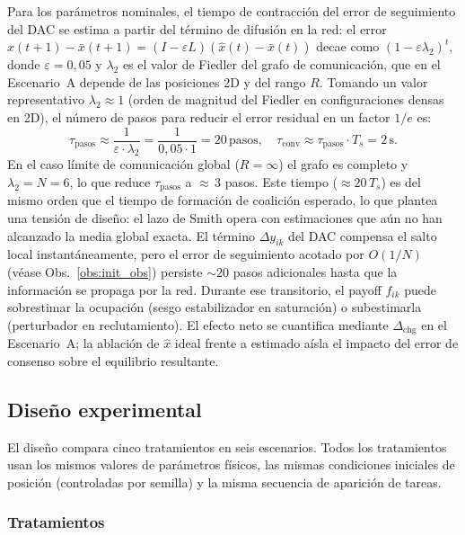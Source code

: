 \begin{observacion}
Para los parámetros nominales, el tiempo de contracción del error de seguimiento
del DAC se estima a partir del término de difusión en la red: el error
$\hat{x}(t{+}1) - \bar{x}(t{+}1) = (I - \varepsilon L)(\hat{x}(t) - \bar{x}(t))$
decae como $(1 - \varepsilon\lambda_2)^t$, donde $\varepsilon = 0{,}05$ y $\lambda_2$
es el valor de Fiedler del grafo de comunicación, que en el Escenario~A depende de
las posiciones 2D y del rango $R$. Tomando un valor representativo $\lambda_2 \approx 1$
(orden de magnitud del Fiedler en configuraciones densas en 2D), el número de pasos
para reducir el error residual en un factor $1/e$ es:
\[
  \tau_{\mathrm{pasos}} \approx \frac{1}{\varepsilon \cdot \lambda_2}
  = \frac{1}{0{,}05 \cdot 1} = 20\,\text{pasos},
  \quad
  \tau_{\mathrm{conv}} \approx \tau_{\mathrm{pasos}} \cdot T_s = 2\,\text{s}.
\]
En el caso límite de comunicación global ($R = \infty$) el grafo es completo y
$\lambda_2 = N = 6$, lo que reduce $\tau_{\mathrm{pasos}}$ a ${\approx}\,3$ pasos.
Este tiempo (${\approx}20\,T_s$) es del mismo orden que el tiempo de formación de
coalición esperado, lo que plantea una tensión de diseño: el lazo de Smith
opera con estimaciones que aún no han alcanzado la media global exacta.
El término $\Delta y_{ik}$ del DAC compensa el salto local instantáneamente,
pero el error de seguimiento acotado por $O(1/N)$ (véase Obs.~\ref{obs:init_obs})
persiste $\sim 20$ pasos adicionales hasta que la información se propaga por la red.
Durante ese transitorio, el payoff $f_{ik}$ puede sobrestimar la ocupación (sesgo
estabilizador en saturación) o subestimarla (perturbador en reclutamiento).
El efecto neto se cuantifica mediante $\Delta_{\mathrm{chg}}$ en el Escenario~A;
la ablación de $\hat{x}$ ideal frente a estimado aísla el impacto del error
de consenso sobre el equilibrio resultante.
\end{observacion}

\subsection{Diseño experimental}
\label{subsec:experimental}

El diseño compara cinco tratamientos en seis escenarios. Todos los tratamientos
usan los mismos valores de parámetros físicos, las mismas condiciones iniciales
de posición (controladas por semilla) y la misma secuencia de aparición de tareas.

\subsubsection{Tratamientos}

